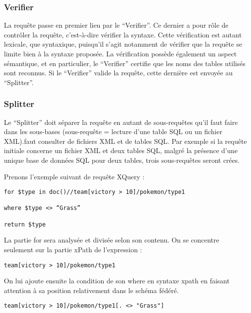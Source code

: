 \subsubsection{Verifier}

La requête passe en premier lieu par le “Verifier”. Ce dernier a pour rôle de contrôler la requête, c’est-à-dire vérifier la syntaxe. Cette vérification est autant lexicale, que syntaxique, puisqu’il s’agit notamment de vérifier que la requête se limite bien à la syntaxe proposée. La vérification possède également un aspect sémantique, et en particulier, le “Verifier” certifie que les noms des tables utilisés sont reconnus. Si le “Verifier” valide la requête, cette dernière est envoyée au “Splitter”.

\subsubsection{Splitter}

Le “Splitter” doit séparer la requête en autant de sous-requêtes qu’il faut faire dans les sous-bases (sous-requête = lecture d'une table SQL ou un fichier XML).faut consulter de fichiers XML et de tables SQL. Par exemple si la requête initiale concerne un fichier XML et deux tables SQL, malgré la présence d’une unique base de données SQL pour deux tables, trois sous-requêtes seront crées.

Prenons l’exemple suivant de requête XQuery :

\begin{verbatim}
for $type in doc()//team[victory > 10]/pokemon/type1

where $type <> “Grass”

return $type
\end{verbatim}

La partie for sera analysée et divisée selon son contenu. On se concentre seulement sur la partie xPath de l’expression :

\lstset{language=SQL}
\begin{lstlisting}
team[victory > 10]/pokemon/type1
\end{lstlisting}

On lui ajoute ensuite la condition de son where en syntaxe xpath en faisant attention à sa position relativement dans le schéma fédéré.

\lstset{language=SQL}
\begin{lstlisting}
team[victory > 10]/pokemon/type1[. <> "Grass"]
\end{lstlisting}

